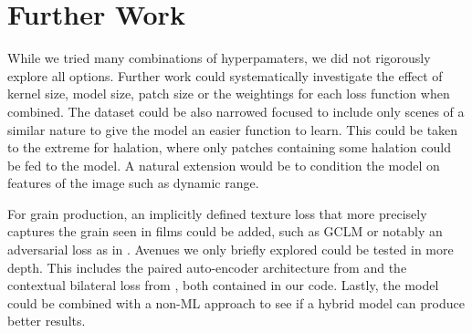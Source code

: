 \section{Further Work}
\label{sec:further-work}

While we tried many combinations of hyperpamaters, we did not rigorously explore all options. Further work could systematically investigate the effect of kernel size, model size, patch size or the weightings for each loss function when combined. The dataset could be also narrowed focused to include only scenes of a similar nature to give the model an easier function to learn. This could be taken to the extreme for halation, where only patches containing some halation could be fed to the model. A natural extension would be to condition the model on features of the image such as dynamic range. 

For grain production, an implicitly defined texture loss that more precisely captures the grain seen in films could be added, such as GCLM \cite{glcm} or notably an adversarial loss as in \cite{dslr-quality}. Avenues we only briefly explored could be tested in more depth. This includes the paired auto-encoder architecture from \cite{raw-to-raw} and the contextual bilateral loss from \cite{zoom-to-learn}, both contained in our code. Lastly, the model could be combined with a non-ML approach to see if a hybrid model can produce better results.